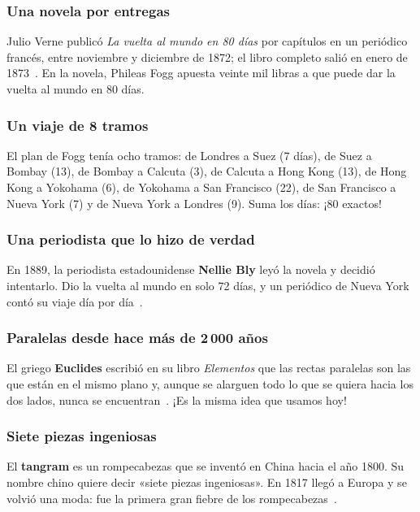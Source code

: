 \documentclass[11pt]{article}
\begin{document}

\subsubsection*{Una novela por entregas}
Julio Verne publicó \emph{La vuelta al mundo en 80 días} por capítulos en un
periódico francés, entre noviembre y diciembre de 1872; el libro completo
salió en enero de 1873~\cite{cijv}. En la novela, Phileas Fogg apuesta
veinte mil libras a que puede dar la vuelta al mundo en 80 días.

\subsubsection*{Un viaje de 8 tramos}
El plan de Fogg tenía ocho tramos: de Londres a Suez (7 días), de Suez a
Bombay (13), de Bombay a Calcuta (3), de Calcuta a Hong Kong (13), de Hong
Kong a Yokohama (6), de Yokohama a San Francisco (22), de San Francisco a
Nueva York (7) y de Nueva York a Londres (9). Suma los días: ¡80
exactos!~\cite{verne}

\subsubsection*{Una periodista que lo hizo de verdad}
En 1889, la periodista estadounidense \textbf{Nellie Bly} leyó la novela y
decidió intentarlo. Dio la vuelta al mundo en solo 72 días, y un periódico de
Nueva York contó su viaje día por día~\cite{nwhm}.

\subsubsection*{Paralelas desde hace más de 2\,000 años}
El griego \textbf{Euclides} escribió en su libro \emph{Elementos} que las
rectas paralelas son las que están en el mismo plano y, aunque se alarguen
todo lo que se quiera hacia los dos lados, nunca se encuentran~\cite{euclides}.
¡Es la misma idea que usamos hoy!

\subsubsection*{Siete piezas ingeniosas}
El \textbf{tangram} es un rompecabezas que se inventó en China hacia el año
1800. Su nombre chino quiere decir «siete piezas ingeniosas». En 1817 llegó a
Europa y se volvió una moda: fue la primera gran fiebre de los
rompecabezas~\cite{britz}.
\end{document}
